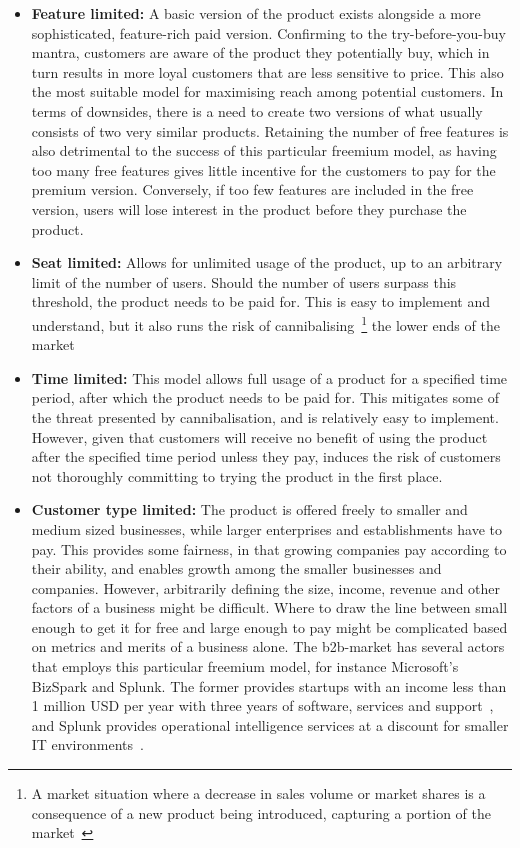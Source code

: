 \begin{itemize}
    \item \textbf{Feature limited: }A basic version of the product exists alongside a more sophisticated, feature-rich paid version. Confirming to the try-before-you-buy mantra, customers are aware of the product they potentially buy, which in turn results in more loyal customers that are less sensitive to price. This also the most suitable model for maximising reach among potential customers. In terms of downsides, there is a need to create two versions of what usually consists of two very similar products. Retaining the number of free features is also detrimental to the success of this particular freemium model, as having too many free features gives little incentive for the customers to pay for the premium version. Conversely, if too few features are included in the free version, users will lose interest in the product before they purchase the product.
    \item \textbf{Seat limited: }Allows for unlimited usage of the product, up to an arbitrary limit of the number of users. Should the number of users surpass this threshold, the product needs to be paid for. This is easy to implement and understand, but it also runs the risk of cannibalising~\footnote{A market situation where a decrease in sales volume or market shares is a consequence of a new product being introduced, capturing a portion of the market~\cite{lifeofentrepeneur2015}} the lower ends of the market
    \item \textbf{Time limited: }This model allows full usage of a product for a specified time period, after which the product needs to be paid for. This mitigates some of the threat presented by cannibalisation, and is relatively easy to implement. However, given that customers will receive no benefit of using the product after the specified time period unless they pay, induces the risk of customers not thoroughly committing to trying the product in the first place.
    \item \textbf{Customer type limited: }The product is offered freely to smaller and medium sized businesses, while larger enterprises and establishments have to pay. This provides some fairness, in that growing companies pay according to their ability, and enables growth among the smaller businesses and companies. However, arbitrarily defining the size, income, revenue and other factors of a business might be difficult. Where to draw the line between small enough to get it for free and large enough to pay might be complicated based on metrics and merits of a business alone. The \gls{b2b}-market has several actors that employs this particular freemium model, for instance Microsoft's BizSpark and Splunk. The former provides startups with an income less than 1 million USD per year with three years of software, services and support~\cite{microsoft2016}, and Splunk provides operational intelligence services at a discount for smaller IT environments~\cite{splunk2016}.
\end{itemize}


